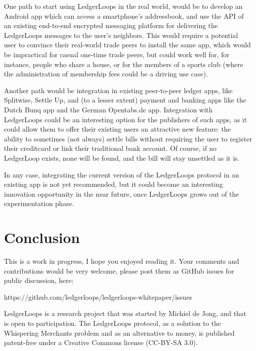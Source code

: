 \documentclass[11pt,twoside,a4paper]{article}
\begin{document}
One path to start using LedgerLoops in the real world, would be to develop an Android app which can access a smartphone's addressbook, and use the API of an existing end-to-end encrypted messaging platform for delivering the LedgerLoops messages to the user's neighbors. This would require a potential user to convince their real-world trade peers to install the same app, which would be impractical for casual one-time trade peers, but could work well for, for instance, people who share a house, or for the members of a sports club (where the administration of membership fees could be a driving use case).

Another path would be integration in existing peer-to-peer ledger apps, like Splitwise, Settle Up, and (to a lesser extent) payment and banking apps like the Dutch Bunq app and the German Opentabs.de app. Integration with LedgerLoops could be an interesting option for the publishers of such apps, as it could allow them to offer their existing users an attractive new feature: the ability to sometimes (not always) settle bills without requiring the user to register their creditcard or link their traditional bank account. Of course, if no LedgerLoop exists, none will be found, and the bill will stay unsettled as it is.

In any case, integrating the current version of the LedgerLoops protocol in an existing app is not yet recommended, but it could become an interesting innovation opportunity in the near future, once LedgerLoops grows out of the experimentation phase.

\section{Conclusion}
This is a work in progress, I hope you enjoyed reading it. Your comments and contributions would be very welcome, please post them as
GitHub issues for public discussion, here:

https://github.com/ledgerloops/ledgerloops-whitepaper/issues

LedgerLoops is a research project that was started by Michiel de Jong, and that is open to participation. The LedgerLoops protocol, as a solution to the Whispering Merchants problem and as an alternative to money, is published patent-free under a Creative Commons license (CC-BY-SA 3.0).
\end{document}
